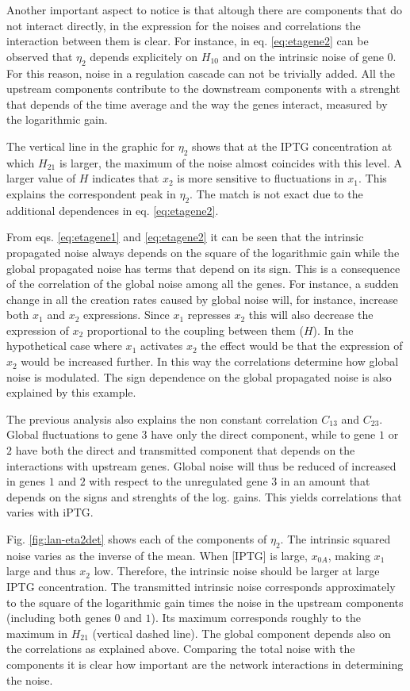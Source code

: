 Another important aspect to notice is that altough there are components that do not interact directly, in the expression for the noises and correlations the interaction between them is clear. For instance, in eq. \eqref{eq:etagene2} can be observed that $\eta_2$ depends explicitely on $H_{10}$ and on the intrinsic noise of gene $0$. For this reason, noise in a regulation cascade can not be trivially added. All the upstream components contribute to the downstream components with a strenght that depends of the time average and the way the genes interact, measured by the logarithmic gain.

The vertical line in the graphic for $\eta_2$ shows that at the IPTG concentration at which $H_{21}$ is larger, the maximum of the noise almost coincides with this level. A larger value of $H$ indicates that $x_2$ is more sensitive to fluctuations in $x_1$. This explains the correspondent peak in $\eta_2$. The match is not exact due to the additional dependences in eq. \eqref{eq:etagene2}. 

From eqs. \eqref{eq:etagene1} and \eqref{eq:etagene2} it can be seen that the intrinsic propagated noise always depends on the square of the logarithmic gain while the global propagated noise has terms that depend on its sign. This is a consequence of the correlation of the global noise among all the genes. For instance, a sudden change in all the creation rates caused by global noise will, for instance, increase both $x_1$ and $x_2$ expressions. Since $x_1$ represses $x_2$ this will also decrease the expression of $x_2$ proportional to the coupling between them ($H$). In the hypothetical case where $x_1$ activates $x_2$ the effect would be that the expression of $x_2$ would be increased further. In this way the correlations determine how global noise is modulated. The sign dependence on the global propagated noise is also explained by this example. 

The previous analysis also explains the non constant correlation $C_{13}$ and $C_{23}$. Global fluctuations to gene $3$ have only the direct component, while to gene $1$ or $2$ have both the direct and transmitted component that depends on the interactions with upstream genes. Global noise will thus be reduced of increased in genes $1$ and $2$ with respect to the unregulated gene $3$ in an amount that depends on the signs and strenghts of the log. gains. This yields correlations that varies with iPTG.

Fig. \ref{fig:lan-eta2det} shows each of the components of $\eta_2$. The intrinsic squared noise varies as the inverse of the mean. When [IPTG] is large, $x_{0A}$, making $x_1$ large and thus $x_2$ low. Therefore, the intrinsic noise should be larger at large IPTG concentration. The transmitted intrinsic noise corresponds approximately to the square of the logarithmic gain times the noise in the upstream components (including both genes $0$ and $1$). Its maximum corresponds roughly to the maximum in $H_{21}$ (vertical dashed line). The global component depends also on the correlations as explained above. Comparing the total noise with the components it is clear how important are the network interactions in determining the noise.

